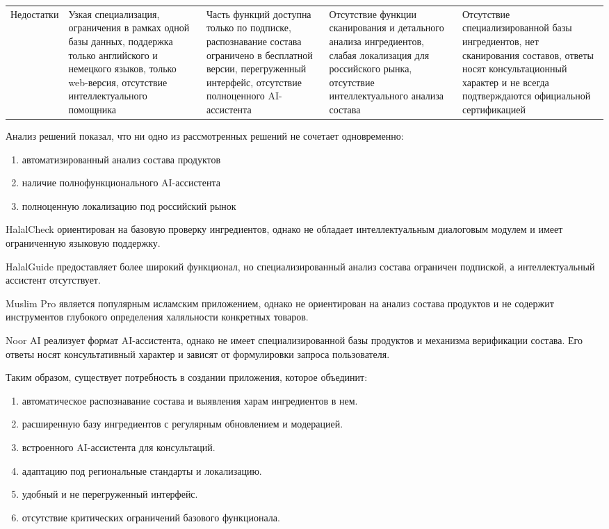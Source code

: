 \begin{longtable}{|>{\small}p{2.8cm}|>{\small}p{2.95cm}|>{\small}p{2.95cm}|>{\small}p{2.95cm}|>{\small}p{2.95cm}|}
\hline
	Недостатки & Узкая специализация, ограничения в рамках одной базы данных, поддержка только английского и немецкого языков, только web-версия, отсутствие интеллектуального помощника & Часть функций доступна только по подписке, распознавание состава ограничено в бесплатной версии, перегруженный интерфейс, отсутствие полноценного AI-ассистента & Отсутствие функции сканирования и детального анализа ингредиентов, слабая локализация для российского рынка, отсутствие интеллектуального анализа состава & Отсутствие специализированной базы ингредиентов, нет сканирования составов, ответы носят консультационный характер и не всегда подтверждаются официальной сертификацией \\
\end{longtable}


Анализ решений показал, что ни одно из рассмотренных решений не сочетает одновременно:

\begin{enumerate}
	\item автоматизированный анализ состава продуктов
	\item наличие полнофункционального AI-ассистента
	\item полноценную локализацию под российский рынок
\end{enumerate}

HalalCheck ориентирован на базовую проверку ингредиентов, однако не обладает интеллектуальным диалоговым модулем и имеет ограниченную языковую поддержку.


HalalGuide предоставляет более широкий функционал, но специализированный анализ состава ограничен подпиской, а интеллектуальный ассистент отсутствует.


Muslim Pro является популярным исламским приложением, однако не ориентирован на анализ состава продуктов и не содержит инструментов глубокого определения халяльности конкретных товаров.


Noor AI реализует формат AI-ассистента, однако не имеет специализированной базы продуктов и механизма верификации состава. Его ответы носят консультативный характер и зависят от формулировки запроса пользователя.


Таким образом, существует потребность в создании приложения, которое объединит:

\begin{enumerate}
	\item автоматическое распознавание состава и выявления харам ингредиентов в нем.
	\item расширенную базу ингредиентов с регулярным обновлением и модерацией.
	\item встроенного AI-ассистента для консультаций.
	\item адаптацию под региональные стандарты и локализацию.
	\item удобный и не перегруженный интерфейс.
	\item отсутствие критических ограничений базового функционала.
\end{enumerate}


